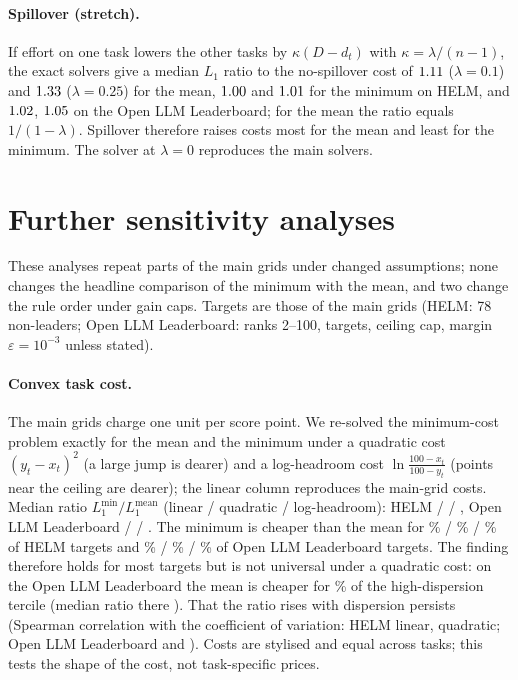 \paragraph{Spillover (stretch).} If effort on one task lowers the other tasks by $\kappa(D-d_t)$ with $\kappa=\lambda/(n-1)$, the exact solvers give a median $L_1$ ratio to the no-spillover cost of $1.11$ ($\lambda=0.1$) and $1.33$ ($\lambda=0.25$) for the mean, $1.00$ and $1.01$ for the minimum on HELM, and $1.02$, $1.05$ on the Open LLM Leaderboard; for the mean the ratio equals $1/(1-\lambda)$. Spillover therefore raises costs most for the mean and least for the minimum. The solver at $\lambda=0$ reproduces the main solvers.

\section{Further sensitivity analyses}
\label{app:sens}

These analyses repeat parts of the main grids under changed assumptions; none changes the headline comparison of the minimum with the mean, and two change the rule order under gain caps. Targets are those of the main grids (HELM: 78 non-leaders; Open LLM Leaderboard: ranks 2--100, \cvxOllbLinearN{} targets, ceiling cap, margin $\varepsilon=10^{-3}$ unless stated).

\paragraph{Convex task cost.} The main grids charge one unit per score point. We re-solved the minimum-cost problem exactly for the mean and the minimum under a quadratic cost $(y_t-x_t)^2$ (a large jump is dearer) and a log-headroom cost $\ln\frac{100-x_t}{100-y_t}$ (points near the ceiling are dearer); the linear column reproduces the main-grid costs. Median ratio $L_1^{\min}/L_1^{\mathrm{mean}}$ (linear / quadratic / log-headroom): HELM \cvxHelmLinearRatio{} / \cvxHelmQuadraticRatio{} / \cvxHelmLogheadRatio, Open LLM Leaderboard \cvxOllbLinearRatio{} / \cvxOllbQuadraticRatio{} / \cvxOllbLogheadRatio. The minimum is cheaper than the mean for \cvxHelmLinearShare\% / \cvxHelmQuadraticShare\% / \cvxHelmLogheadShare\% of HELM targets and \cvxOllbLinearShare\% / \cvxOllbQuadraticShare\% / \cvxOllbLogheadShare\% of Open LLM Leaderboard targets. The finding therefore holds for most targets but is not universal under a quadratic cost: on the Open LLM Leaderboard the mean is cheaper for \cvxOllbQuadHighMeanCheaper\% of the high-dispersion tercile (median ratio there \cvxOllbQuadHighRatio). That the ratio rises with dispersion persists (Spearman correlation with the coefficient of variation: HELM \cvxHelmLinearRho{} linear, \cvxHelmQuadraticRho{} quadratic; Open LLM Leaderboard \cvxOllbLinearRho{} and \cvxOllbQuadraticRho). Costs are stylised and equal across tasks; this tests the shape of the cost, not task-specific prices.

